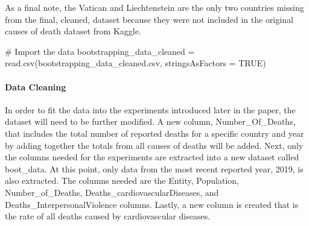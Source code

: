 \documentclass[
  letterpaper,
  DIV=11,
  numbers=noendperiod]{scrartcl}
\let\oldparagraph\paragraph
\renewcommand{\paragraph}[1]{\oldparagraph{#1}\mbox{}}
\newenvironment{Shaded}{\begin{snugshade}}{\end{snugshade}}
\newcommand{\AttributeTok}[1]{\textcolor[rgb]{0.40,0.45,0.13}{#1}}
\newcommand{\CommentTok}[1]{\textcolor[rgb]{0.37,0.37,0.37}{#1}}
\newcommand{\ConstantTok}[1]{\textcolor[rgb]{0.56,0.35,0.01}{#1}}
\newcommand{\FunctionTok}[1]{\textcolor[rgb]{0.28,0.35,0.67}{#1}}
\newcommand{\NormalTok}[1]{\textcolor[rgb]{0.00,0.23,0.31}{#1}}
\newcommand{\OtherTok}[1]{\textcolor[rgb]{0.00,0.23,0.31}{#1}}
\newcommand{\StringTok}[1]{\textcolor[rgb]{0.13,0.47,0.30}{#1}}
\begin{document}
As a final note, the Vatican and Liechtenstein are the only two
countries missing from the final, cleaned, dataset because they were not
included in the original causes of death dataset from Kaggle.

\begin{Shaded}
\begin{Highlighting}[]
\CommentTok{\# Import the data}
\NormalTok{bootstrapping\_data\_cleaned }\OtherTok{=} \FunctionTok{read.csv}\NormalTok{(}\StringTok{\textquotesingle{}bootstrapping\_data\_cleaned.csv\textquotesingle{}}\NormalTok{, }
                                      \AttributeTok{stringsAsFactors =} \ConstantTok{TRUE}\NormalTok{)}
\end{Highlighting}
\end{Shaded}

\hypertarget{data-cleaning}{%
\paragraph{Data Cleaning}\label{data-cleaning}}

In order to fit the data into the experiments introduced later in the
paper, the dataset will need to be further modified. A new column,
Number\_Of\_Deaths, that includes the total number of reported deaths
for a specific country and year by adding together the totals from all
causes of deaths will be added. Next, only the columns needed for the
experiments are extracted into a new dataset called boot\_data. At this
point, only data from the most recent reported year, 2019, is also
extracted. The columns needed are the Entity, Population,
Number\_of\_Deaths, Deaths\_cardiovascularDiseases, and
Deaths\_InterpersonalViolence columns. Lastly, a new column is created
that is the rate of all deaths caused by cardiovascular diseases.
\end{document}
